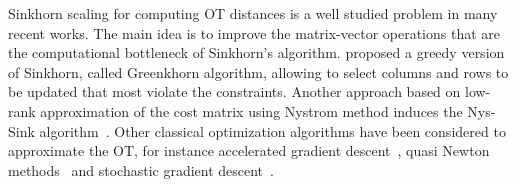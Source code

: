 Sinkhorn scaling for computing OT distances is a well studied problem in many recent works. 
The main idea is to improve the matrix-vector operations that are the computational bottleneck of Sinkhorn’s algorithm. 
\citet{altschulernips17} proposed a greedy version of Sinkhorn, called Greenkhorn algorithm, allowing to select columns and rows to be updated that most violate the constraints.                   
Another approach based on low-rank approximation of the cost matrix using Nystrom method induces the Nys-Sink algorithm~\citep{altschuler2018Nystrom}. 
Other classical optimization algorithms have been considered to approximate the OT, for instance accelerated gradient descent~\citep{xie2018proxpointOT,dvurechensky18aICML,lin2019}, quasi Newton methods~\citep{blondel2018ICML,cuturi2016SIAM} and stochastic gradient descent~\citep{genevay2016stochOT,khalilabid2018}. 

